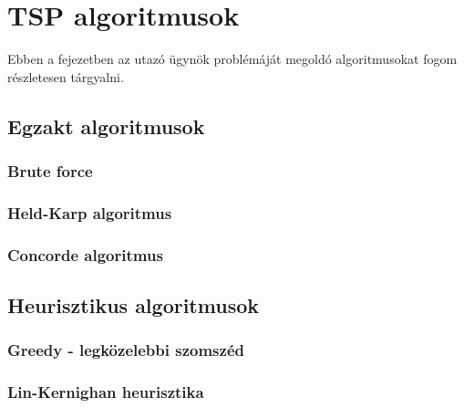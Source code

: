 \chapter{TSP algoritmusok}\label{ch:ALAP}

\begin{osszefoglal}
	Ebben a fejezetben az utazó ügynök problémáját megoldó algoritmusokat fogom részletesen tárgyalni.
	
\end{osszefoglal}

\section{Egzakt algoritmusok}\label{sec:ALAP:adatelem}

\subsection{Brute force}

\subsection{Held-Karp algoritmus}

\subsection{Concorde algoritmus}

\section{Heurisztikus algoritmusok}\label{sec:ALAP:adatelem}

\subsection{Greedy - legközelebbi szomszéd}

\subsection{Lin-Kernighan heurisztika}